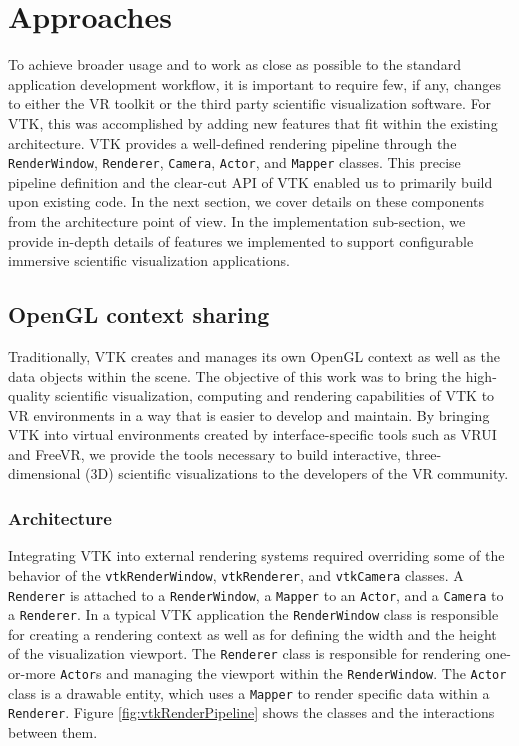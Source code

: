 \section{Approaches}

To achieve broader usage and to work as close as possible to the standard application development workflow, it is important to require few, if any, changes to either the VR toolkit or the third party scientific visualization software.
For VTK, this was accomplished by adding new features that fit within the existing architecture. 
VTK provides a well-defined rendering pipeline through the \texttt{RenderWindow}, \texttt{Renderer}, \texttt{Camera}, \texttt{Actor}, and \texttt{Mapper} classes.
This precise pipeline definition and the clear-cut API of VTK enabled us to primarily build upon
existing code.
In the next section, we cover details on these components from the architecture point of view.
In the implementation sub-section, we provide in-depth details of features we implemented to support configurable immersive scientific visualization applications. 

\subsection{OpenGL context sharing}

Traditionally, VTK creates and manages its own OpenGL context as well as the data objects within the scene.
The objective of this work was to bring the high-quality scientific visualization, computing and rendering capabilities of VTK to VR environments in a way that is easier to develop and maintain.
By bringing VTK into virtual environments created by interface-specific tools such as VRUI and FreeVR, we provide the tools necessary to build interactive, three-dimensional (3D) scientific visualizations to the developers of the VR community.

\subsubsection{Architecture}

Integrating VTK into external rendering systems required overriding some of the behavior of the \texttt{vtkRenderWindow}, \texttt{vtkRenderer}, and \texttt{vtkCamera} classes.
A \texttt{Renderer} is attached to a \texttt{RenderWindow}, a \texttt{Mapper} to an \texttt{Actor}, and a \texttt{Camera} to a \texttt{Renderer}.
In a typical VTK application the \texttt{RenderWindow} class is responsible for creating a rendering context as well as for defining the width and the height of the visualization viewport.
The \texttt{Renderer} class is responsible for rendering one-or-more
\texttt{Actor}s and managing the viewport within the \texttt{RenderWindow}.
The \texttt{Actor} class is a drawable entity, which uses a \texttt{Mapper} to render specific data within a \texttt{Renderer}.
Figure \ref{fig:vtkRenderPipeline} shows the classes and the interactions between them.

